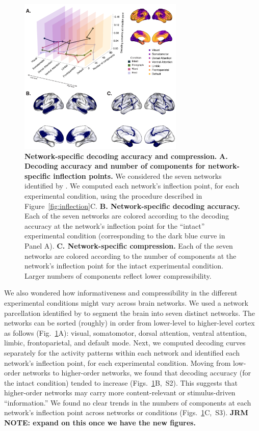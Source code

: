 \documentclass[english, 11pt]{article}
\newcommand{\accuracyNetworks}{S2}
\newcommand{\componentsNetworks}{S3}
\begin{document}
\begin{figure}[tp]
  \centering
  \includegraphics[width=0.7\textwidth]{figs/decode_pcs_network}

  \caption{\textbf{Network-specific decoding accuracy and compression.}
  \textbf{A. Decoding accuracy and number of components for network-specific
  inflection points.} We considered the seven networks identified by
  \cite{YeoEtal11}. We computed each network's inflection point, for each
  experimental condition, using the procedure described in
  Figure~\ref{fig:inflection}C. \textbf{B. Network-specific decoding
  accuracy.} Each of the seven networks are colored according to the decoding
  accuracy at the network's inflection point for the ``intact'' experimental
  condition (corresponding to the dark blue curve in Panel A). \textbf{C.
  Network-specific compression.} Each of the seven networks are colored
  according to the number of components at the network's inflection point for
  the intact experimental condition. Larger numbers of components reflect lower
  compressibility.}

  \label{fig:networks}
\end{figure}

We also wondered how informativeness and compressibility in the different
experimental conditions might vary across brain networks. We used a network
parcellation identified by \cite{YeoEtal11} to segment the brain into seven
distinct networks. The networks can be sorted (roughly) in order from
lower-level to higher-level cortex as follows (Fig.~\ref{fig:networks}A):
visual, somatomotor, dorsal attention, ventral attention, limbic,
frontoparietal, and default mode. Next, we computed decoding curves separately
for the activity patterns within each network and identified each network's
inflection point, for each experimental condition. Moving from low-order
networks to higher-order networks, we found that decoding accuracy (for the
intact condition) tended to increase
(Figs.~\ref{fig:networks}B,~\accuracyNetworks). This suggests that higher-order
networks may carry more content-relevant or stimulus-driven ``information.'' We
found no clear trends in the numbers of components at each network's inflection
point across networks or conditions
(Figs.~\ref{fig:networks}C,~\componentsNetworks). \textbf{JRM NOTE: expand on
this once we have the new figures.}
\end{document}
